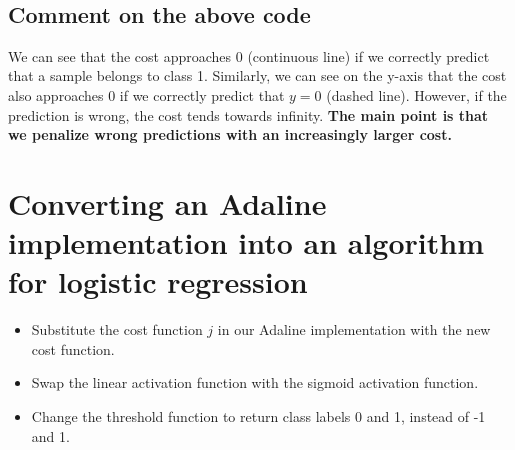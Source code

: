 \documentclass[11pt]{article}
\providecommand{\tightlist}{%
      \setlength{\itemsep}{0pt}\setlength{\parskip}{0pt}}
\begin{document}
    \begin{center}
    \end{center}
    { \hspace*{\fill} \\}
    
    \subsection{Comment on the above code}\label{comment-on-the-above-code}

We can see that the cost approaches 0 (continuous line) if we correctly
predict that a sample belongs to class 1. Similarly, we can see on the
y-axis that the cost also approaches 0 if we correctly predict that
\(y = 0\) (dashed line). However, if the prediction is wrong, the cost
tends towards infinity. \textbf{The main point is that we penalize wrong
predictions with an increasingly larger cost.}

    \section{Converting an Adaline implementation into an algorithm for
logistic
regression}\label{converting-an-adaline-implementation-into-an-algorithm-for-logistic-regression}

\begin{itemize}
\tightlist
\item
  Substitute the cost function \(j\) in our Adaline implementation with
  the new cost function.
\item
  Swap the linear activation function with the sigmoid activation
  function.
\item
  Change the threshold function to return class labels 0 and 1, instead
  of -1 and 1.
\end{itemize}
\end{document}
